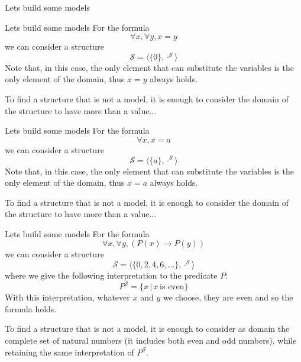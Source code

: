 \documentclass[aspectratio=169]{beamer}
\begin{document}
\begin{slide}{Lets build some models}
\end{slide}

\begin{slide}{Lets build some models}
For the formula $$\forall x, \forall y, x = y$$ we can consider a structure $$\mathcal{S} = \langle \{0\},\cdot^\mathcal{S} \rangle$$
Note that, in this case, the only element that can substitute the variables is the only element of the domain, thus $x = y$ always holds.

To find a structure that is not a model, it is enough to consider the domain of the structure to have more than a value...
\end{slide}

\begin{slide}{Lets build some models}
For the formula $$\forall x, x = a$$ we can consider a structure $$\mathcal{S} = \langle \{a\},\cdot^\mathcal{S} \rangle$$
Note that, in this case, the only element that can substitute the variables is the only element of the domain, thus $x = a$ always holds.

To find a structure that is not a model, it is enough to consider the domain of the structure to have more than a value...
\end{slide}

\begin{slide}{Lets build some models}
For the formula $$\forall x, \forall y, (P(x) \to P(y))$$ we can consider a structure $$\mathcal{S} = \langle \{0,2,4,6,\ldots\},\cdot^\mathcal{S} \rangle$$
where we give the following interpretation to the predicate $P$: $$P^\mathcal{S} = \{x\,|\,x\,\text{is even} \}$$ With this interpretation, whatever $x$ and $y$ we choose, they are even and so the formula holds.

To find a structure that is not a model, it is enough to consider as domain the complete set of natural numbers (it includes both even and odd numbers), while retaining the same interpretation of $P^\mathcal{S}$.
\end{slide}
\end{document}

